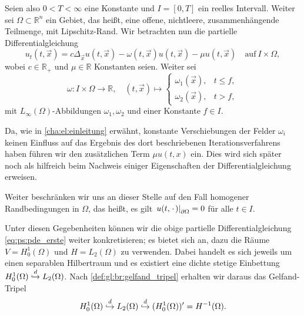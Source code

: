Seien also $0 < T < \infty$ eine Konstante und $I = [0, T]$ ein reelles Intervall.
Weiter sei $\Omega \subset \mathbb{R}^{n}$ ein Gebiet, das heißt, eine offene, nichtleere, zusammenhängende Teilmenge, mit Lipschitz-Rand.
Wir betrachten nun die partielle Differentialgleichung
\begin{equation}
\label{eq:ps:pde:pde_erste_erwaehnung}
    u_{t}(t, \vec{x}) = c \Delta_{\vec{x}} u(t, \vec{x}) - \omega(t, \vec{x}) u(t, \vec{x}) - \mu u(t, \vec{x}) \quad \text{auf}~I \times \Omega,
\end{equation}
wobei $c \in \mathbb{R}_{+}$ und $\mu \in \mathbb{R}$ Konstanten seien.
Weiter sei
\begin{equation}
\label{eq:ps:pde:omega_definition}
    \omega \colon I \times \Omega \to \mathbb{R}, \quad (t, \vec{x}) \mapsto
    \begin{cases}
        \omega_{1}(\vec{x}), & t \leq f, \\
        \omega_{2}(\vec{x}), & t > f,
    \end{cases}
\end{equation}
mit $L_{\infty}(\Omega)$-Abbildungen $\omega_{1}, \omega_{2}$ und einer Konstante $f \in I$.

Da, wie in \cref{cha:el:einleitung} erwähnt, konstante Verschiebungen der Felder $\omega_{i}$ keinen Einfluss auf das Ergebnis des dort beschriebenen Iterationsverfahrens haben führen wir den zusätzlichen Term $\mu u(t, x)$ ein.
Dies wird sich später noch als hilfreich beim Nachweis einiger Eigenschaften der Differentialgleichung erweisen.

Weiter beschränken wir uns an dieser Stelle auf den Fall homogener Randbedingungen in $\Omega$, das heißt, es gilt $\left.u(t, {\mkern2mu\cdot\mkern2mu})\right|_{\partial \Omega} = 0$ für alle $t \in I$.

Unter diesen Gegebenheiten können wir die obige partielle Differentialgleichung \cref{eq:ps:pde_erste} weiter konkretisieren; es bietet sich an, dazu die Räume $V = H^{1}_{0}(\Omega)$ und $H = L_{2}(\Omega)$ zu verwenden.
Dabei handelt es sich jeweils um einen separablen Hilbertraum und es existiert eine dichte stetige Einbettung $H^{1}_{0}(\Omega) \stackrel{d}{\hookrightarrow} L_{2}(\Omega)$.
Nach \cref{def:gl:br:gelfand_tripel} erhalten wir daraus das Gelfand-Tripel
\begin{equation}
\label{eq:ps:pde:gelfand_triple}
    H^{1}_{0}(\Omega) \stackrel{d}{\hookrightarrow} L_{2}(\Omega) \stackrel{d}{\hookrightarrow} (H^{1}_{0}(\Omega))' = H^{-1}(\Omega).
\end{equation}


